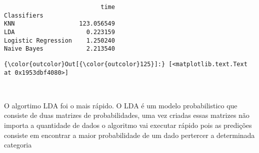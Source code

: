 \documentclass[11pt]{article}
\begin{document}
    
    \begin{verbatim}
                           time
Classifiers                    
KNN                  123.056549
LDA                    0.223159
Logistic Regression    1.250240
Naive Bayes            2.213540
    \end{verbatim}

    
\begin{Verbatim}[commandchars=\\\{\}]
{\color{outcolor}Out[{\color{outcolor}125}]:} [<matplotlib.text.Text at 0x1953dbf4080>]
\end{Verbatim}
            
    \begin{center}
    \end{center}
    { \hspace*{\fill} \\}
    
    O algortimo LDA foi o mais rápido. O LDA é um modelo probabilistico que
consiste de duas matrizes de probabilidades, uma vez criadas essas
matrizes não importa a quantidade de dados o algoritmo vai executar
rápido pois as predições consiste em encontrar a maior probabilidade de
um dado pertercer a determinada categoria


    
    
    
    
\end{document}
